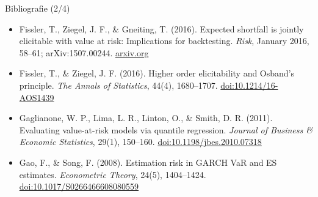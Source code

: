 \begin{frame}{Bibliografie (2/4)}
\begin{itemize}
    \item Fissler, T., Ziegel, J. F., \& Gneiting, T. (2016). Expected shortfall is jointly elicitable with value at risk: Implications for backtesting. \textit{Risk}, January 2016, 58--61; arXiv:1507.00244. \href{https://arxiv.org/abs/1507.00244}{arxiv.org}
    \item Fissler, T., \& Ziegel, J. F. (2016). Higher order elicitability and Osband's principle. \textit{The Annals of Statistics}, 44(4), 1680--1707. \href{https://doi.org/10.1214/16-AOS1439}{doi:10.1214/16-AOS1439}
    \item Gaglianone, W. P., Lima, L. R., Linton, O., \& Smith, D. R. (2011). Evaluating value-at-risk models via quantile regression. \textit{Journal of Business \& Economic Statistics}, 29(1), 150--160. \href{https://doi.org/10.1198/jbes.2010.07318}{doi:10.1198/jbes.2010.07318}
    \item Gao, F., \& Song, F. (2008). Estimation risk in GARCH VaR and ES estimates. \textit{Econometric Theory}, 24(5), 1404--1424. \href{https://doi.org/10.1017/S0266466608080559}{doi:10.1017/S0266466608080559}
\end{itemize}
\end{frame}

